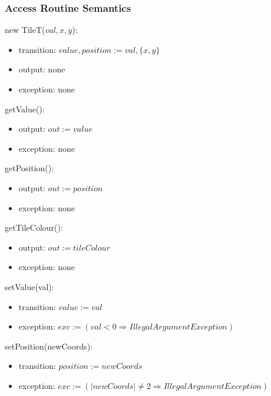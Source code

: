 \documentclass[12pt]{article}
\begin{document}
\subsubsection* {Access Routine Semantics}

\noindent new TileT($\mathit{val}, \mathit{x}, \mathit{y}$):
\begin{itemize}
\item transition: $\mathit{value}, \mathit{position} := \mathit{val}, \{x, y\}$
\item output: none
\item exception: none
\end{itemize}

\noindent getValue():
\begin{itemize}
\item output: $out := \mathit{value}$
\item exception: none
\end{itemize}

\noindent getPosition():
\begin{itemize}
\item output: $out := \mathit{position}$
\item exception: none
\end{itemize}

\noindent getTileColour():
\begin{itemize}
\item output: $out := \mathit{tileColour}$
\item exception: none
\end{itemize}

\noindent setValue(val):
\begin{itemize}
\item transition: $value := \mathit{val}$
\item exception: $exc := (val < 0 \Rightarrow IllegalArgumentException)$
\end{itemize}

\noindent setPosition(newCoords):
\begin{itemize}
\item transition: $position := \mathit{newCoords}$
\item exception: $exc := (\vert newCoords \vert \neq 2 \Rightarrow IllegalArgumentException)$
\end{itemize}
\end{document}
